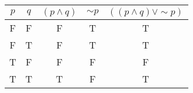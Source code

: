 \begin{tabular}{|c|c||c|c|c|}
\hline
$ p $ & $ q $ & $ (p \wedge q) $ & $  \sim p $ & $ ((p \wedge q) \vee  \sim p) $ \\
\hline
F & F & F & T & T \\
F & T & F & T & T \\
T & F & F & F & F \\
T & T & T & F & T \\
\hline
\end{tabular}
\label{table:tt1}

